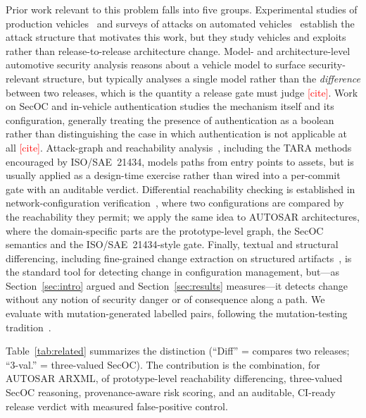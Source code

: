 \documentclass[journal]{IEEEtran}
\newcommand{\needcite}{\textcolor{red}{[cite]}}
\begin{document}
Prior work relevant to this problem falls into five groups. Experimental
studies of production vehicles~\cite{koscher,checkoway,miller} and surveys of
attacks on automated vehicles~\cite{petit} establish the attack structure that
motivates this work, but they study vehicles and exploits rather than
release-to-release architecture change. Model- and architecture-level
automotive security analysis reasons about a vehicle model to surface
security-relevant structure, but typically analyses a single model rather than
the \emph{difference} between two releases, which is the quantity a release gate
must judge \needcite. Work on SecOC and in-vehicle authentication studies the
mechanism itself and its configuration, generally treating the presence of
authentication as a boolean rather than distinguishing the case in which
authentication is not applicable at all \needcite. Attack-graph and
reachability analysis~\cite{sheyner,ou}, including the TARA methods encouraged
by ISO/SAE~21434, models paths from entry points to assets, but is usually
applied as a design-time exercise rather than wired into a per-commit gate with
an auditable verdict. Differential reachability checking is established in
network-configuration verification~\cite{fogel}, where two configurations are
compared by the reachability they permit; we apply the same idea to AUTOSAR
architectures, where the domain-specific parts are the prototype-level graph,
the SecOC semantics and the ISO/SAE~21434-style gate. Finally, textual and
structural differencing, including fine-grained change extraction on structured
artifacts~\cite{fluri}, is the standard tool for detecting change in
configuration management, but---as Section~\ref{sec:intro} argued and
Section~\ref{sec:results} measures---it detects change without any notion of
security danger or of consequence along a path. We evaluate with
mutation-generated labelled pairs, following the mutation-testing
tradition~\cite{jia}.

Table~\ref{tab:related} summarizes the distinction (``Diff'' = compares two
releases; ``3-val.'' = three-valued SecOC). The contribution is the combination,
for AUTOSAR ARXML, of prototype-level reachability differencing, three-valued
SecOC reasoning, provenance-aware risk scoring, and an auditable, CI-ready
release verdict with measured false-positive control.
\end{document}
